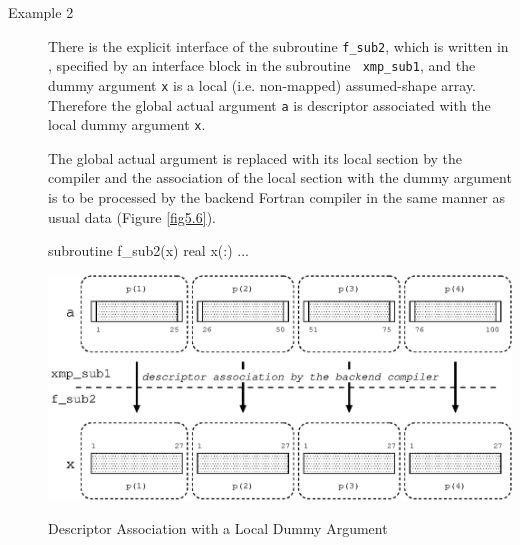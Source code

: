 \begin{description}
\item[Example 2]

	   There is the explicit interface of the subroutine
	   {\tt f\_sub2}, which is written in {\XMPF},
	   specified by an interface block in the subroutine {\tt
	   xmp\_sub1}, and the dummy argument {\tt x} is a local
	   (i.e. non-mapped) assumed-shape array. Therefore the global
	   actual argument {\tt a} is descriptor associated with the
	   local dummy argument {\tt x}.

	   The global actual argument is replaced with its local section
	   by the {\XMP} compiler and the association of the local
	   section with the dummy argument is to be processed by the
	   backend Fortran compiler in the same manner as usual data 
	   (Figure \ref{fig5.6}).

\begin{Fexample}
      subroutine f_sub2(x)
      real x(:)
      ...
\end{Fexample}

\begin{myfigure}
 \includegraphics[scale=0.7]{figs/fig5.6.eps}
 \caption{Descriptor Association with a Local Dummy Argument}
 \label{fig5.6}
\end{myfigure}

\end{description}


